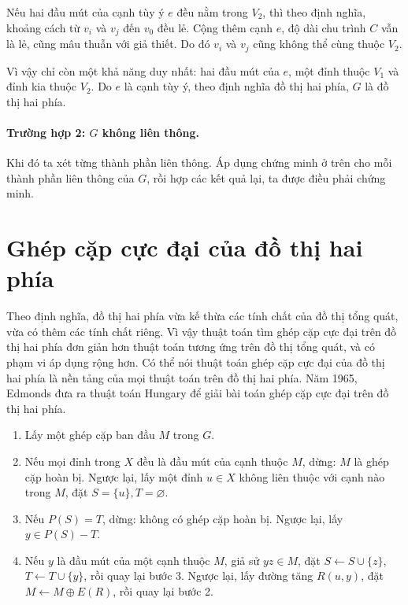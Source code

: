 \documentclass[11pt]{article}
\begin{document}
Nếu hai đầu mút của cạnh tùy ý \(e\) đều nằm trong \(V_2\), thì theo định
nghĩa, khoảng cách từ \(v_i\) và \(v_j\) đến \(v_0\) đều lẻ. Cộng thêm cạnh
\(e\), độ dài chu trình \(C\) vẫn là lẻ, cũng mâu thuẫn với giả thiết. Do đó
\(v_i\) và \(v_j\) cũng không thể cùng thuộc \(V_2\).

Vì vậy chỉ còn một khả năng duy nhất: hai đầu mút của \(e\), một đỉnh thuộc
\(V_1\) và đỉnh kia thuộc \(V_2\). Do \(e\) là cạnh tùy ý, theo định nghĩa
đồ thị hai phía, \(G\) là đồ thị hai phía.

\paragraph{Trường hợp 2: \(G\) không liên thông.}
Khi đó ta xét từng thành phần liên thông. Áp dụng chứng minh ở trên cho mỗi
thành phần liên thông của \(G\), rồi hợp các kết quả lại, ta được điều phải
chứng minh.

\section{Ghép cặp cực đại của đồ thị hai phía}

Theo định nghĩa, đồ thị hai phía vừa kế thừa các tính chất của đồ thị tổng
quát, vừa có thêm các tính chất riêng. Vì vậy thuật toán tìm ghép cặp cực đại
trên đồ thị hai phía đơn giản hơn thuật toán tương ứng trên đồ thị tổng quát,
và có phạm vi áp dụng rộng hơn. Có thể nói thuật toán ghép cặp cực đại của
đồ thị hai phía là nền tảng của mọi thuật toán trên đồ thị hai phía. Năm
1965, Edmonds đưa ra thuật toán Hungary để giải bài toán ghép cặp cực đại
trên đồ thị hai phía.

\begin{enumerate}
  \item Lấy một ghép cặp ban đầu \(M\) trong \(G\).
  \item Nếu mọi đỉnh trong \(X\) đều là đầu mút của cạnh thuộc \(M\), dừng:
  \(M\) là ghép cặp hoàn bị. Ngược lại, lấy một đỉnh \(u\in X\) không liên
  thuộc với cạnh nào trong \(M\), đặt \(S=\{u\}, T=\varnothing\).
  \item Nếu \(P(S)=T\), dừng: không có ghép cặp hoàn bị. Ngược lại, lấy
  \(y\in P(S)-T\).
  \item Nếu \(y\) là đầu mút của một cạnh thuộc \(M\), giả sử \(yz\in M\),
  đặt \(S\leftarrow S\cup\{z\}\), \(T\leftarrow T\cup\{y\}\), rồi quay lại
  bước 3. Ngược lại, lấy đường tăng \(R(u,y)\), đặt
  \(M\leftarrow M\oplus E(R)\), rồi quay lại bước 2.
\end{enumerate}
\end{document}
